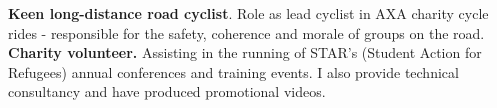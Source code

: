 \documentclass[11pt]{article}
\begin{document}
\textbf{Keen long-distance road cyclist}. Role as lead cyclist in AXA charity cycle rides - responsible for the safety, coherence and morale of groups on the road.\\
\noindent \textbf{Charity volunteer.} Assisting in the running of STAR's (Student Action for Refugees) annual conferences and training events.
I also provide technical consultancy and have produced promotional videos.

\end{document}
